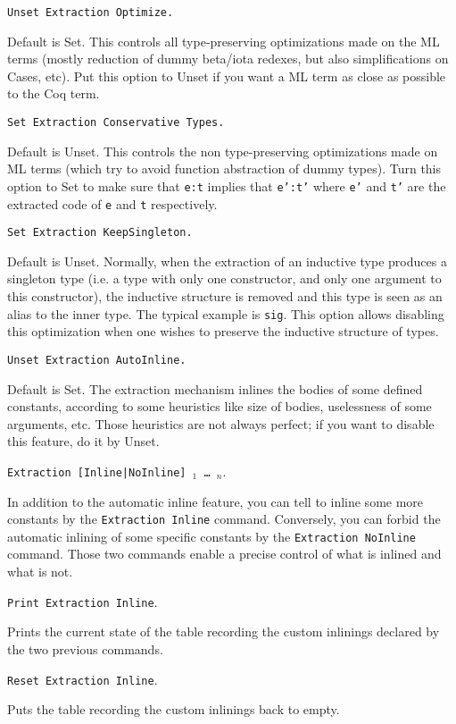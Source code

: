 \begin{description}

\item {} {\tt Unset Extraction Optimize.}

Default is Set. This controls all type-preserving optimizations made on
the ML terms (mostly reduction of dummy beta/iota redexes, but also
simplifications on Cases, etc). Put this option to Unset if you want a
ML term as close as possible to the Coq term.

\item {}
{\tt Set Extraction Conservative Types.}

Default is Unset. This controls the non type-preserving optimizations
made on ML terms (which try to avoid function abstraction of dummy
types). Turn this option to Set to make sure that {\tt e:t}
implies that {\tt e':t'} where {\tt e'} and {\tt t'} are the extracted
code of {\tt e} and {\tt t} respectively.

\item {}
{\tt Set Extraction KeepSingleton.}

Default is Unset. Normally, when the extraction of an inductive type
produces a singleton type (i.e. a type with only one constructor, and
only one argument to this constructor), the inductive structure is
removed and this type is seen as an alias to the inner type.
The typical example is {\tt sig}. This option allows disabling this
optimization when one wishes to preserve the inductive structure of types.

\item {} {\tt Unset Extraction AutoInline.}

Default is Set. The extraction mechanism
inlines the bodies of some defined constants, according to some heuristics
like size of bodies, uselessness of some arguments, etc. Those heuristics are
not always perfect; if you want to disable this feature, do it by Unset.

\item {} 
{\tt Extraction [Inline|NoInline] \qualid$_1$ \dots\ \qualid$_n$}.

In addition to the automatic inline feature, you can tell to
inline some more constants by the {\tt Extraction Inline} command. Conversely, 
you can forbid the automatic inlining of some specific constants by
the {\tt Extraction NoInline} command.
Those two commands enable a precise control of what is inlined and what is not. 

\item {}
{\tt Print Extraction Inline}. 

Prints the current state of the table recording the custom inlinings 
declared by the two previous commands. 

\item {}
{\tt Reset Extraction Inline}. 

Puts the table recording the custom inlinings back to empty. 

\end{description}


